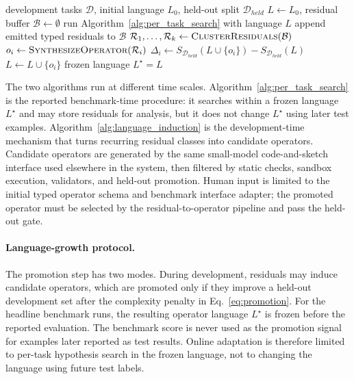 \documentclass[letterpaper]{article}
\begin{document}
\begin{algorithm}[t]
\caption{Development-time residual-conditioned language induction}
\label{alg:language_induction}
\begin{algorithmic}[1]
\REQUIRE development tasks $\mathcal{D}$, initial language $L_0$, held-out split $\mathcal{D}_{held}$
\STATE $L\leftarrow L_0$, residual buffer $\mathcal{B}\leftarrow\emptyset$
  \STATE run Algorithm~\ref{alg:per_task_search} with language $L$
  \STATE append emitted typed residuals to $\mathcal{B}$
\ENDFOR
\STATE $\mathcal{R}_1,\ldots,\mathcal{R}_k\leftarrow\textsc{ClusterResiduals}(\mathcal{B})$
  \STATE $o_i\leftarrow\textsc{SynthesizeOperator}(\mathcal{R}_i)$
    \STATE $\Delta_i\leftarrow S_{\mathcal{D}_{held}}(L\cup\{o_i\})-S_{\mathcal{D}_{held}}(L)$
      \STATE $L\leftarrow L\cup\{o_i\}$
    \ENDIF
  \ENDIF
\ENDFOR
\RETURN frozen language $L^\star=L$
\end{algorithmic}
\end{algorithm}

The two algorithms run at different time scales. Algorithm~\ref{alg:per_task_search}
is the reported benchmark-time procedure: it searches within a frozen language
$L^\star$ and may store residuals for analysis, but it does not change
$L^\star$ using later test examples. Algorithm~\ref{alg:language_induction}
is the development-time mechanism that turns recurring residual classes into
candidate operators. Candidate operators are generated by the same small-model
code-and-sketch interface used elsewhere in the system, then filtered by static
checks, sandbox execution, validators, and held-out promotion. Human input is
limited to the initial typed operator schema and benchmark interface adapter;
the promoted operator must be selected by the residual-to-operator pipeline and
pass the held-out gate.

\paragraph{Language-growth protocol.}
The promotion step has two modes. During development, residuals may induce
candidate operators, which are promoted only if they improve a held-out
development set after the complexity penalty in Eq.~\eqref{eq:promotion}. For the headline
benchmark runs, the resulting operator language $L^\star$ is frozen before the
reported evaluation. The benchmark score is never used as the promotion signal
for examples later reported as test results. Online adaptation is therefore
limited to per-task hypothesis search in the frozen language, not to changing
the language using future test labels.
\end{document}
